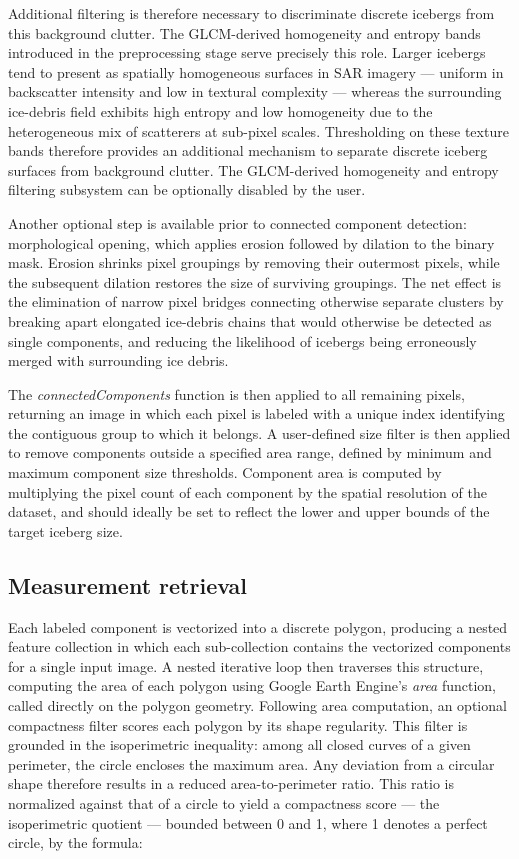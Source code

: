 \documentclass[11pt, letterpaper]{article}
\begin{document}
Additional filtering is therefore necessary to discriminate discrete icebergs from this background clutter. The GLCM-derived homogeneity and entropy bands introduced in the preprocessing stage serve precisely this role. Larger icebergs tend to present as spatially homogeneous surfaces in SAR imagery --- uniform in backscatter intensity and low in textural complexity --- whereas the surrounding ice-debris field exhibits high entropy and low homogeneity due to the heterogeneous mix of scatterers at sub-pixel scales. Thresholding on these texture bands therefore provides an additional mechanism to separate discrete iceberg surfaces from background clutter. The GLCM-derived homogeneity and entropy filtering subsystem can be optionally disabled by the user.

Another optional step is available prior to connected component detection: morphological opening, which applies erosion followed by dilation to the binary mask. Erosion shrinks pixel groupings by removing their outermost pixels, while the subsequent dilation restores the size of surviving groupings. The net effect
is the elimination of narrow pixel bridges connecting otherwise separate clusters by breaking apart elongated ice-debris chains that would otherwise be detected as single components, and reducing the likelihood of icebergs being erroneously merged with surrounding ice debris.

The \textit{connectedComponents} function is then applied to all remaining pixels,
returning an image in which each pixel is labeled with a unique index identifying
the contiguous group to which it belongs. A user-defined size filter is then applied
to remove components outside a specified area range, defined by minimum and maximum
component size thresholds. Component area is computed by multiplying the pixel count
of each component by the spatial resolution of the dataset, and should ideally be
set to reflect the lower and upper bounds of the target iceberg size.

\subsection{Measurement retrieval}

Each labeled component is vectorized into a discrete polygon, producing a nested feature collection in which each sub-collection contains the vectorized components for a single input image. A nested iterative loop then traverses this structure, computing the area of each polygon using Google Earth Engine's \textit{area} function, called directly on the polygon geometry. Following area computation, an optional compactness filter scores each polygon by its shape regularity. This filter is grounded in the isoperimetric inequality: among all closed curves of a given perimeter, the circle encloses the maximum area. Any deviation from a circular shape therefore results in a reduced area-to-perimeter ratio. This ratio is normalized against that of a circle to yield a compactness score --- the isoperimetric quotient
--- bounded between 0 and 1, where 1 denotes a perfect circle, by the formula:
\end{document}
